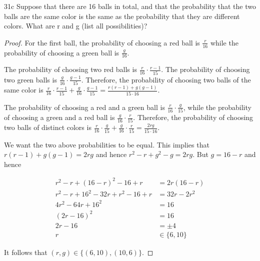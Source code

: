 \begin{exercise}{31c}
Suppose that there are 16 balls in total, and that the probability that the two balls
are the same color is the same as the probability that they are different colors. What
are r and g (list all possibilities)?
\end{exercise}

\begin{proof}
    For the first ball, the probability of choosing a red ball is $\frac{r}{16}$ while the probability of choosing a green ball is $\frac{g}{16}$.

    The probability of choosing two red balls is $\frac{r}{16} \cdot \frac{r-1}{15}$. The probability of choosing two green balls is $\frac{g}{16} \cdot \frac{g-1}{15}$. Therefore, the probability of choosing two balls of the same color is $\frac{r}{16} \cdot \frac{r-1}{15} + \frac{g}{16} \cdot \frac{g-1}{15} = \frac{r(r-1) + g(g-1)}{15 \cdot 16}$.

    The probability of choosing a red and a green ball is $\frac{r}{16} \cdot \frac{g}{15}$, while the probability of choosing a green and a red ball is $\frac{g}{16} \cdot \frac{r}{15}$. Therefore, the probability of choosing two balls of distinct colors is $\frac{r}{16} \cdot \frac{g}{15} + \frac{g}{16} \cdot \frac{r}{15} = \frac{2rg}{15 \cdot 16}$.

    We want the two above probabilities to be equal. This implies that $r(r-1) + g(g-1) = 2rg$ and hence $r^2 - r + g^2 - g = 2rg$. But $g = 16-r$ and hence 
    
    
    \begin{align*}
        r^2 - r + (16-r)^2 - 16 + r &= 2r(16-r) \\
        r^2 - r + 16^2 - 32r + r^2 - 16 + r &= 32r - 2r^2 \\
        4r^2-64r+16^2 &= 16 \\
        (2r-16)^2 &= 16 \\
        2r-16 &= \pm 4 \\
        r &\in \{6, 10\}
    \end{align*}

    It follows that $(r,g) \in \{(6,10), (10, 6)\}$.
\end{proof}

\newpage


